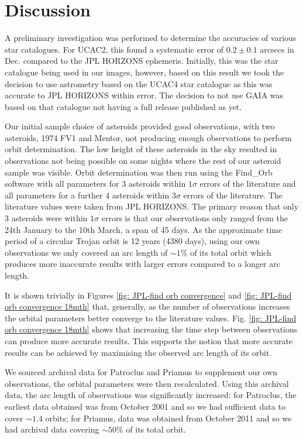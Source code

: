 \documentclass[10pt, twocolumn]{revtex4}    %
\begin{document}
\section{Discussion}

A preliminary investigation was performed to determine the accuracies of various star catalogues. For UCAC2, this found a systematic error of $0.2\pm0.1$ arcsecs in Dec. compared to the JPL HORZONS ephemeris. Initially, this was the star catalogue being used in our images, however, based on this result we took the decision to use astrometry based on the UCAC4 star catalogue as this was accurate to JPL HORIZONS within error. The decision to not use GAIA was based on that catalogue not having a full release published as yet. 

Our initial sample choice of asteroids provided good observations, with two asteroids, 1974 FV1 and Mentor, not producing enough observations to perform orbit determination. The low height of these asteroids in the sky resulted in observations not being possible on some nights where the rest of our asteroid sample was visible. Orbit determination was then run using the Find\_Orb software with all parameters for 3 asteroids within $1\sigma$ errors of the literature and all parameters for a further 4 asteroids within $3\sigma$ errors of the literature. The literature values were taken from JPL HORIZONS. The primary reason that only 3 asteroids were within $1\sigma$ errors is that our observations only ranged from the 24th January to the 10th March, a span of 45 days. As the approximate time period of a circular Trojan orbit is 12 years (4380 days), using our own observations we only covered an arc length of ${\sim}1\%$ of its total orbit which produces more inaccurate results with larger errors compared to a longer arc length.

It is shown trivially in Figures \ref{fig: JPL-find orb convergence} and \ref{fig: JPL-find orb convergence 18mth} that, generally, as the number of observations increases the orbital parameters better converge to the literature values. Fig. \ref{fig: JPL-find orb convergence 18mth} shows that increasing the time step between observations can produce more accurate results. This supports the notion that more accurate results can be achieved by maximising the observed arc length of its orbit.

We sourced archival data for Patroclus and Priamus to supplement our own observations, the orbital parameters were then recalculated. Using this archival data, the arc length of observations was significantly increased: for Patroclus, the earliest data obtained was from October 2001 and so we had sufficient data to cover ${\sim}1.4$ orbits; for Priamus, data was obtained from October 2011 and so we had archival data covering ${\sim}50\%$ of its total orbit.
\end{document}

